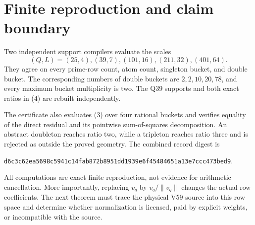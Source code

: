 \section{Finite reproduction and claim boundary}

Two independent support compilers evaluate the scales
\[
 (Q,L)=(25,4),(39,7),(101,16),(211,32),(401,64).
\]
They agree on every prime-row count, atom count, singleton bucket, and double bucket.
The corresponding numbers of double buckets are $2,2,10,20,78$, and every maximum
bucket multiplicity is two.  The Q39 supports and both exact ratios in (4) are rebuilt
independently.

The certificate also evaluates (3) over four rational buckets and verifies equality of
the direct residual and its pointwise sum-of-squares decomposition.  An abstract
doubleton reaches ratio two, while a tripleton reaches ratio three and is rejected as
outside the proved geometry.  The combined record digest is
\begin{center}
\texttt{d6c3c62ea5698c5941c14fab872b8951dd1939e6f45484651a13e7ccc473bed9}.
\end{center}

All computations are exact finite reproduction, not evidence for arithmetic
cancellation.  More importantly, replacing $v_q$ by $v_q/\|v_q\|$ changes the actual
row coefficients.  The next theorem must trace the physical V59 source into this row
space and determine whether normalization is licensed, paid by explicit weights, or
incompatible with the source.
